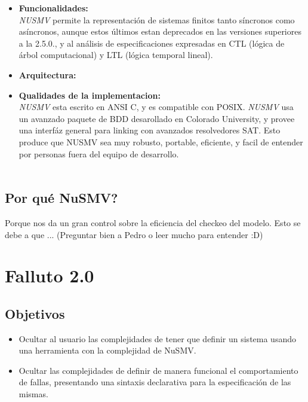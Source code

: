 \documentclass[titlepage, 10pt]{article}
\begin{document}
\begin{itemize}


\item%
\textbf{Funcionalidades:}\\

\emph{NUSMV} permite la representaci\'on de sistemas finitos tanto s\'incronos
como as\'incronos, aunque estos \'ultimos estan deprecados en las versiones superiores
a la 2.5.0., y al an\'alisis de especificaciones expresadas en CTL (l\'ogica de \'arbol
computacional) y LTL (l\'ogica temporal lineal).


\item%
\textbf{Arquitectura:}\\


\item%
\textbf{Qualidades de la implementacion:}\\

\emph{NUSMV} esta escrito en ANSI C, y es compatible con POSIX. \emph{NUSMV} usa un avanzado
paquete de BDD desarollado en Colorado University, y provee una interf\'az general para
linking con avanzados resolvedores SAT. Esto produce que NUSMV sea muy robusto, portable,
eficiente, y facil de entender por personas fuera del equipo de desarrollo.\\
\\


\end{itemize}


\subsection{Por qu\'e NuSMV?}

Porque nos da un gran control sobre la eficiencia del checkeo del modelo. Esto se debe
a que ... (Preguntar bien a Pedro o leer mucho para entender :D)


\section{Falluto 2.0}

\subsection{Objetivos}
\begin{itemize}
\item%
Ocultar al usuario las complejidades de tener que definir un sistema usando una herramienta
con la complejidad de NuSMV.
\item
Ocultar las complejidades de definir de manera funcional el comportamiento de fallas,
presentando una sintaxis declarativa para la especificaci\'on de las mismas.
\end{itemize}
\end{document}
